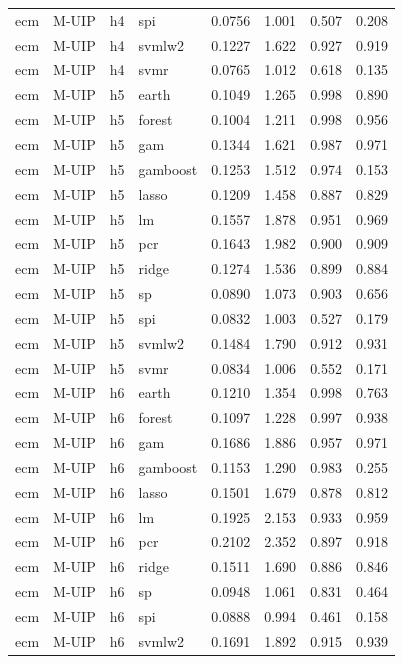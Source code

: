 \begin{ThreePartTable}
\begin{longtable}[t]{llclcccc}
ecm & M-UIP & h4 & spi & 0.0756 & 1.001 & 0.507 & 0.208\\
ecm & M-UIP & h4 & svmlw2 & 0.1227 & 1.622 & 0.927 & 0.919\\
ecm & M-UIP & h4 & svmr & 0.0765 & 1.012 & 0.618 & 0.135\\
\addlinespace
ecm & M-UIP & h5 & earth & 0.1049 & 1.265 & 0.998 & 0.890\\
ecm & M-UIP & h5 & forest & 0.1004 & 1.211 & 0.998 & 0.956\\
ecm & M-UIP & h5 & gam & 0.1344 & 1.621 & 0.987 & 0.971\\
ecm & M-UIP & h5 & gamboost & 0.1253 & 1.512 & 0.974 & 0.153\\
ecm & M-UIP & h5 & lasso & 0.1209 & 1.458 & 0.887 & 0.829\\
ecm & M-UIP & h5 & lm & 0.1557 & 1.878 & 0.951 & 0.969\\
ecm & M-UIP & h5 & pcr & 0.1643 & 1.982 & 0.900 & 0.909\\
ecm & M-UIP & h5 & ridge & 0.1274 & 1.536 & 0.899 & 0.884\\
ecm & M-UIP & h5 & sp & 0.0890 & 1.073 & 0.903 & 0.656\\
ecm & M-UIP & h5 & spi & 0.0832 & 1.003 & 0.527 & 0.179\\
ecm & M-UIP & h5 & svmlw2 & 0.1484 & 1.790 & 0.912 & 0.931\\
ecm & M-UIP & h5 & svmr & 0.0834 & 1.006 & 0.552 & 0.171\\
\addlinespace
ecm & M-UIP & h6 & earth & 0.1210 & 1.354 & 0.998 & 0.763\\
ecm & M-UIP & h6 & forest & 0.1097 & 1.228 & 0.997 & 0.938\\
ecm & M-UIP & h6 & gam & 0.1686 & 1.886 & 0.957 & 0.971\\
ecm & M-UIP & h6 & gamboost & 0.1153 & 1.290 & 0.983 & 0.255\\
ecm & M-UIP & h6 & lasso & 0.1501 & 1.679 & 0.878 & 0.812\\
ecm & M-UIP & h6 & lm & 0.1925 & 2.153 & 0.933 & 0.959\\
ecm & M-UIP & h6 & pcr & 0.2102 & 2.352 & 0.897 & 0.918\\
ecm & M-UIP & h6 & ridge & 0.1511 & 1.690 & 0.886 & 0.846\\
ecm & M-UIP & h6 & sp & 0.0948 & 1.061 & 0.831 & 0.464\\
ecm & M-UIP & h6 & spi & 0.0888 & 0.994 & 0.461 & 0.158\\
ecm & M-UIP & h6 & svmlw2 & 0.1691 & 1.892 & 0.915 & 0.939\\

\end{longtable}
\end{ThreePartTable}
